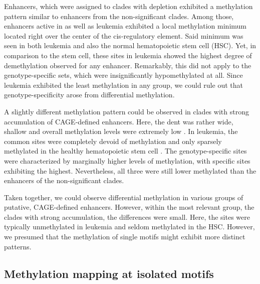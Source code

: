 Enhancers, which were assigned to clades with depletion \dns exhibited a methylation pattern similar to enhancers from the non-significant clades. Among those, enhancers active in \dnmtwt as well as \dnmtchip leukemia exhibited a local methylation minimum located right over the center of the cis-regulatory element. Said minimum was seen in both leukemia and also the normal hematopoietic stem cell (HSC). Yet, in comparison to the stem cell, these sites in leukemia showed the highest degree of demethylation observed for any enhancer. Remarkably, this did not apply to the genotype-specific sets, which were insignificantly hypomethylated at all. Since \dnmtchip leukemia exhibited the least methylation in any group, we could rule out that genotype-specificity arose from differential methylation. 

A slightly different methylation pattern could be observed in clades with strong accumulation of CAGE-defined enhancers. Here, the dent was rather wide, shallow and overall methylation levels were extremely low . In leukemia, the common sites were completely devoid of methylation and only sparsely methylated in the healthy hematopoietic stem cell . The genotype-specific sites were characterized by marginally higher levels of methylation, with \dnmtwt specific sites exhibiting the highest. Nevertheless, all three were still lower methylated than the enhancers of the non-significant clades.

Taken together, we could observe differential methylation in various groups of putative, CAGE-defined enhancers. However, within the most relevant group, the clades with strong accumulation, the differences were small. Here, the sites were typically unmethylated in leukemia and seldom methylated in the HSC. However, we presumed that the methylation of single motifs might exhibit more distinct patterns. 

\subsection{Methylation mapping at isolated motifs}
\label{chap:r:enhancers:motifs:methylation:motifs} 

 \fyfrank


